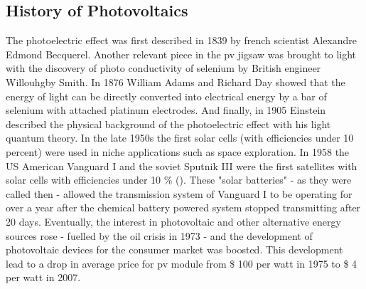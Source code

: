 \subsection{History of Photovoltaics}
The photoelectric effect was first described in 1839 by french scientist Alexandre 
Edmond \linebreak[4] 
Becquerel\cite{becquerel1839memoire}. %
Another relevant piece in the \gls{pv} jigsaw was brought to light
with the discovery of photo conductivity of selenium
by British engineer Willouhgby Smith\cite{Smith1873Selenium}.
In 1876 William Adams and Richard Day\cite{Adams1876Selenium} showed that 
the energy of light can be directly converted into electrical energy by a bar of 
selenium with attached platinum electrodes.
And finally, in 1905 Einstein described the physical background of the photoelectric 
effect with his light quantum theory\cite{einstein1905erzeugung}.
In the late 1950s the first solar cells (with efficiencies under 10 percent) were used in niche applications such as space exploration.  
In 1958 the US American Vanguard I\cite{vanguard2004} and the soviet Sputnik III\cite{sputnik} were the first satellites with solar cells with efficiencies under 10 \% ().
These "solar batteries" - as they were called then - allowed the transmission system of Vanguard I to be operating for over a year after the chemical battery powered system stopped transmitting after 20 days\cite{vanguard2004}. 
%
Eventually, the interest in photovoltaic and other alternative energy sources 
rose - fuelled by the oil crisis in 1973 - 
and the development of photovoltaic devices for the consumer market was boosted. 
This development lead to a drop in 
average price for \gls{pv} module from \$ 100 per watt in 1975 to \$ 4 per watt in 2007\cite{pagliaro2008flexible}.

